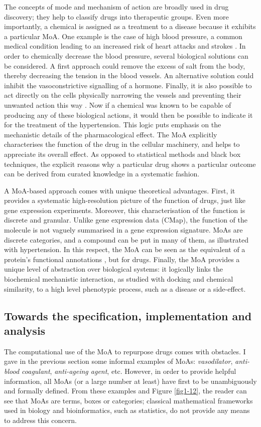 The concepts of mode and mechanism of action are broadly used in drug discovery; they help to classify drugs into therapeutic groups. Even more importantly, a chemical is assigned as a treatment to a disease because it exhibits a particular MoA. One example is the case of high blood pressure, a common medical condition leading to an increased risk of heart attacks and strokes \citep{hypertensionnhs}. In order to chemically decrease the blood pressure, several biological solutions can be considered. A first approach could remove the excess of salt from the body, thereby decreasing the tension in the blood vessels. An alternative solution could inhibit the vasoconstrictive signalling of a hormone. Finally, it is also possible to act directly on the cells physically narrowing the vessels and preventing their unwanted action this way \citep{ong2007prevalence}. Now if a chemical was known to be capable of producing any of these biological actions, it would then be possible to indicate it for the treatment of the hypertension. This logic puts emphasis on the mechanistic details of the pharmacological effect. The MoA explicitly characterises the function of the drug in the cellular machinery, and helps to appreciate its overall effect. As opposed to statistical methods and black box techniques, the explicit reasons why a particular drug shows a particular outcome can be derived from curated knowledge in a systematic fashion.

A MoA-based approach comes with unique theoretical advantages. First, it provides a systematic high-resolution picture of the function of drugs, just like gene expression experiments. Moreover, this characterisation of the function is discrete and granular. Unlike gene expression data (CMap), the function of the molecule is not vaguely summarised in a gene expression signature. MoAs are discrete categories, and a compound can be put in many of them, as illustrated with hypertension. In this respect, the MoA can be seen as the equivalent of a protein's functional annotations \citep{ashburner2000gene}, but for drugs. Finally, the MoA provides a unique level of abstraction over biological systems: it logically links the biochemical mechanistic interaction, as studied with docking and chemical similarity, to a high level phenotypic process, such as a disease or a side-effect.

\subsection{Towards the specification, implementation and analysis}
The computational use of the MoA to repurpose drugs comes with obstacles. I gave in the previous section some informal examples of MoAs: \emph{vasodilator}, \emph{anti-blood coagulant}, \emph{anti-ageing agent}, etc. However, in order to provide helpful information, all MoAs (or a large number at least) have first to be unambiguously and formally defined. From these examples and Figure \ref{fig1-12}, the reader can see that MoAs are terms, boxes or categories; classical mathematical frameworks used in biology and bioinformatics, such as statistics, do not provide any means to address this concern.

